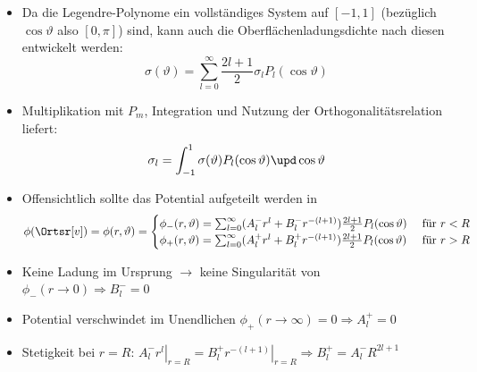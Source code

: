 \begin{frame}
\begin{itemize}[<+->]
\item Da die Legendre-Polynome ein vollständiges System auf $[-1,1]$ (bezüglich $\cos\vartheta$ also $[0,\pi]$) sind, kann auch die Oberflächenladungsdichte nach diesen entwickelt werden:
  $$
  \sigma(\vartheta) = \sum_{l=0}^{\infty}  \frac{2l+1}{2} \sigma_l P_l (\cos\vartheta)
  $$
\item Multiplikation mit $P_m$, Integration und Nutzung der Orthogonalitätsrelation liefert:
  $$
  \sigma_l = \int_{-1}^{1} \sigma(\vartheta) P_l(\cos\vartheta) \upd \cos\vartheta
  $$
\item Offensichtlich sollte das Potential aufgeteilt werden in
  $$
  \phi(\Ortsr[v]) = \phi(r,\vartheta) = \begin{cases}
    \phi_- (r,\vartheta) = \sum_{l=0}^{\infty} (A_{l}^- r^l+ B_{l}^- r^{-(l+1)}) \frac{2l+1}{2} P_l (\cos\vartheta) & \text{ für } r < R \\
    \phi_+ (r,\vartheta)=\sum_{l=0}^{\infty} (A_{l}^+ r^l+ B_{l}^+ r^{-(l+1)}) \frac{2l+1}{2} P_l (\cos\vartheta) & \text{ für } r > R
    \end{cases}
    $$
  \item Keine Ladung im Ursprung $\to$ keine Singularität von $\phi_-(r\to 0) \Rightarrow \boxed{B_l^- =0}$
  \item Potential verschwindet im Unendlichen $\phi_+(r\to \infty) = 0  \Rightarrow \boxed{A_l^+ =0}$
    \item Stetigkeit bei $r=R$: $\left. A_{l}^- r^l\right|_{r=R} = \left. B_{l}^+ r^{-(l+1)}\right|_{r=R} \Rightarrow \boxed{B_{l}^+ = A_{l}^- R^{2l+1} } $  
 \end{itemize} 
\end{frame}

